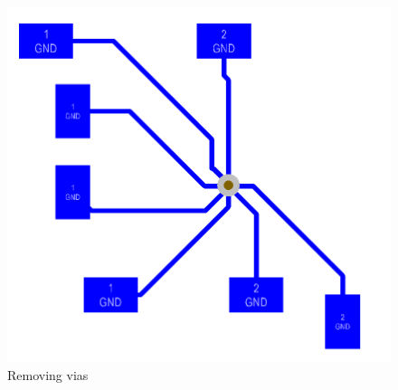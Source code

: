 \begin{figure}[h]
  \centering
  \includegraphics[width=\textwidth]{fig/pcb/pcb_removing_vias.png}
  \caption{Removing vias}
  \label{fig:removingvias-pcb}
\end{figure}
